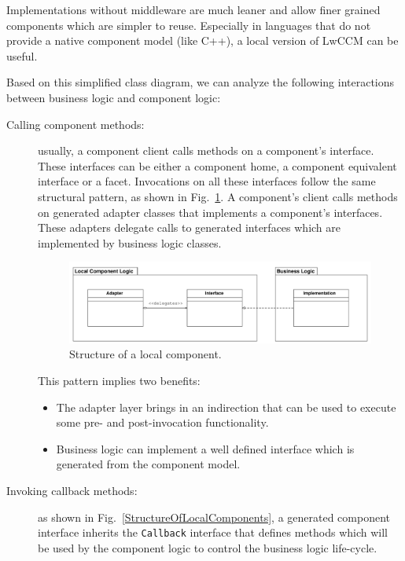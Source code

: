 \noindent
Implementations without middleware are much leaner and allow
finer grained components which are simpler to reuse.
Especially in languages that do not provide a native component model
(like C++), a local version of LwCCM can be useful.  

\newpage
\noindent
Based on this simplified class diagram, we can analyze the following
interactions between business logic and component logic:

\begin{description}
\item [Calling component methods:]
usually, a component client calls methods on a component's interface.
These interfaces can be either a component home, a component equivalent 
interface or a facet.
Invocations on all these interfaces follow the same structural pattern,
as shown in Fig.~\ref{LocalComponentImplementationStructure}.
A component's client calls methods on generated adapter classes 
that implements a component's interfaces. 
These adapters delegate calls 
to generated interfaces which are implemented by business logic classes.
\begin{figure}[htbp]
    \begin{center}
    \includegraphics [width=13cm,angle=0] 
		     {ComponentModel/uml/LocalComponentImplementationStructure}
    \caption{Structure of a local component.}
    \label{LocalComponentImplementationStructure}            
    \end{center}
\end{figure}

This pattern implies two benefits:
\begin{itemize}
\item The adapter layer brings in an indirection that can be used to execute
some pre- and post-invocation functionality.  

\item Business logic can implement a well defined interface which is generated 
from the component model.
\end{itemize}

\item [Invoking callback methods:]
as shown in Fig.~\ref{StructureOfLocalComponents}, a generated component 
interface inherits the {\tt Callback} interface that defines methods which 
will be used by the component logic to control the business logic life-cycle.


\end{description}
